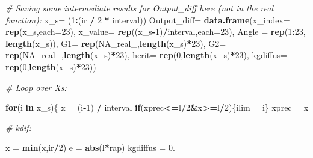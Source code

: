 \documentclass[]{book}
\newenvironment{Shaded}{\begin{snugshade}}{\end{snugshade}}
\newcommand{\KeywordTok}[1]{\textcolor[rgb]{0.13,0.29,0.53}{\textbf{#1}}}
\newcommand{\DataTypeTok}[1]{\textcolor[rgb]{0.13,0.29,0.53}{#1}}
\newcommand{\DecValTok}[1]{\textcolor[rgb]{0.00,0.00,0.81}{#1}}
\newcommand{\StringTok}[1]{\textcolor[rgb]{0.31,0.60,0.02}{#1}}
\newcommand{\CommentTok}[1]{\textcolor[rgb]{0.56,0.35,0.01}{\textit{#1}}}
\newcommand{\OtherTok}[1]{\textcolor[rgb]{0.56,0.35,0.01}{#1}}
\newcommand{\ControlFlowTok}[1]{\textcolor[rgb]{0.13,0.29,0.53}{\textbf{#1}}}
\newcommand{\OperatorTok}[1]{\textcolor[rgb]{0.81,0.36,0.00}{\textbf{#1}}}
\newcommand{\NormalTok}[1]{#1}
\theoremstyle{definition}
\theoremstyle{definition}
\theoremstyle{definition}
\theoremstyle{remark}
\begin{document}
\begin{Shaded}
\begin{Highlighting}[]
\CommentTok{# Saving some intermediate results for Output_diff here (not in the real function):}
\NormalTok{x_s=}\StringTok{ }\NormalTok{(}\DecValTok{1}\OperatorTok{:}\NormalTok{(ir }\OperatorTok{/}\StringTok{ }\DecValTok{2} \OperatorTok{*}\StringTok{ }\NormalTok{interval))}
\NormalTok{Output_diff=}\StringTok{ }\KeywordTok{data.frame}\NormalTok{(}\DataTypeTok{x_index=} \KeywordTok{rep}\NormalTok{(x_s,}\DataTypeTok{each=}\DecValTok{23}\NormalTok{),}
                   \DataTypeTok{x_value=} \KeywordTok{rep}\NormalTok{((x_s}\OperatorTok{-}\DecValTok{1}\NormalTok{)}\OperatorTok{/}\NormalTok{interval,}\DataTypeTok{each=}\DecValTok{23}\NormalTok{),}
                   \DataTypeTok{Angle =} \KeywordTok{rep}\NormalTok{(}\DecValTok{1}\OperatorTok{:}\DecValTok{23}\NormalTok{, }\KeywordTok{length}\NormalTok{(x_s)),}
                   \DataTypeTok{G1=} \KeywordTok{rep}\NormalTok{(}\OtherTok{NA_real_}\NormalTok{,}\KeywordTok{length}\NormalTok{(x_s)}\OperatorTok{*}\DecValTok{23}\NormalTok{),}
                   \DataTypeTok{G2=} \KeywordTok{rep}\NormalTok{(}\OtherTok{NA_real_}\NormalTok{,}\KeywordTok{length}\NormalTok{(x_s)}\OperatorTok{*}\DecValTok{23}\NormalTok{),}
                   \DataTypeTok{hcrit=} \KeywordTok{rep}\NormalTok{(}\DecValTok{0}\NormalTok{,}\KeywordTok{length}\NormalTok{(x_s)}\OperatorTok{*}\DecValTok{23}\NormalTok{),}
                   \DataTypeTok{kgdiffus=} \KeywordTok{rep}\NormalTok{(}\DecValTok{0}\NormalTok{,}\KeywordTok{length}\NormalTok{(x_s)}\OperatorTok{*}\DecValTok{23}\NormalTok{))}


\CommentTok{# Loop over Xs:}

\ControlFlowTok{for}\NormalTok{(i }\ControlFlowTok{in}\NormalTok{ x_s)\{}
\NormalTok{  x =}\StringTok{ }\NormalTok{(i}\OperatorTok{-}\DecValTok{1}\NormalTok{) }\OperatorTok{/}\StringTok{ }\NormalTok{interval}
  \ControlFlowTok{if}\NormalTok{(xprec}\OperatorTok{<=}\NormalTok{l}\OperatorTok{/}\DecValTok{2}\OperatorTok{&}\NormalTok{x}\OperatorTok{>=}\NormalTok{l}\OperatorTok{/}\DecValTok{2}\NormalTok{)\{ilim =}\StringTok{ }\NormalTok{i\}}
\NormalTok{  xprec =}\StringTok{ }\NormalTok{x}
  
  \CommentTok{# kdif:}
  
\NormalTok{  x =}\StringTok{ }\KeywordTok{min}\NormalTok{(x,ir}\OperatorTok{/}\DecValTok{2}\NormalTok{)}
\NormalTok{  e =}\StringTok{ }\KeywordTok{abs}\NormalTok{(l}\OperatorTok{*}\NormalTok{rap)}
\NormalTok{  kgdiffus =}\StringTok{ }\DecValTok{0}\NormalTok{.}
  

\end{Highlighting}
\end{Shaded}
\end{document}
